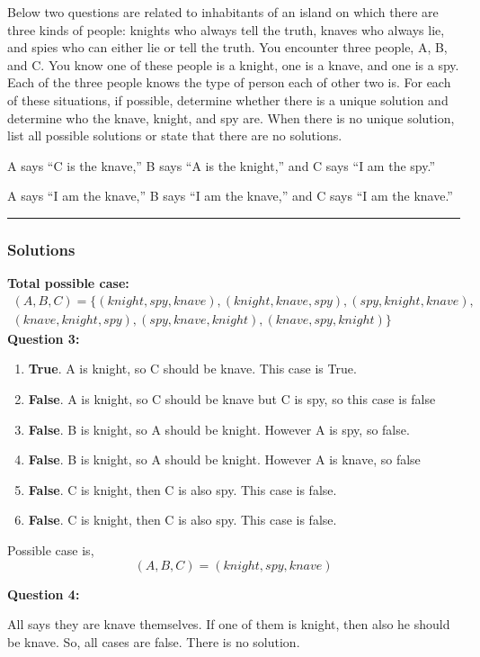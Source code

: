\newpage
\noindent Below two questions are related to inhabitants of an island on which there are three kinds of people: knights who always tell the truth, knaves who always lie, and spies who can either lie or tell the truth. You encounter three people, A, B, and C. You know one of these people is a knight, one is a knave, and one is a spy. Each of the three people knows the type of person each of other two is. For each of these situations, if possible, determine whether there is a unique solution and determine who the knave, knight, and spy are. When there is no unique solution, list all possible solutions or state that there are no solutions.
\begin{question}
A says “C is the knave,” B says “A is the knight,” and C says “I am the spy.”
\end{question}
\begin{question}
A says “I am the knave,” B says “I am the knave,” and C says “I am the knave.”
\end{question}

\par\noindent\rule{\textwidth}{0.5pt}

\subsubsection*{Solutions}

\textbf{Total possible case:}
$$\begin{aligned}
    (A, B, C) = \{(knight, spy, knave), (knight, knave, spy), (spy, knight, knave), \\ (knave, knight, spy), (spy, knave, knight), (knave, spy, knight)\}
\end{aligned}$$
\textbf{Question 3:}
\begin{enumerate}
    \item \textbf{True}. A is knight, so C should be knave. This case is True.
    \item \textbf{False}. A is knight, so C should be knave but C is spy, so this case is false
    \item \textbf{False}. B is knight, so A should be knight. However A is spy, so false.
    \item \textbf{False}. B is knight, so A should be knight. However A is knave, so false
    \item \textbf{False}. C is knight, then C is also spy. This case is false.
    \item \textbf{False}. C is knight, then C is also spy. This case is false.
\end{enumerate}
Possible case is,
$$(A, B, C) = (knight, spy, knave)$$
\bigskip

\noindent\textbf{Question 4:}
\medskip

 All says they are knave themselves. If one of them is knight, then also he should be knave. So, all cases are false. There is no solution.